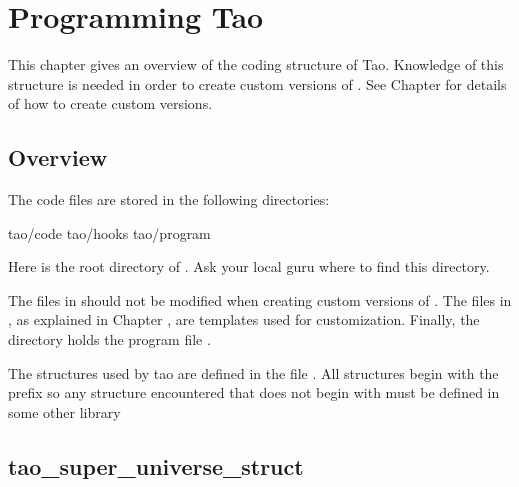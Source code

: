 \chapter{Programming Tao}
\label{c:programming}

This chapter gives an overview of the coding structure of Tao.
Knowledge of this structure is needed in order to create custom
versions of \tao. See Chapter  for details of
how to create custom versions.

\section{Overview}

The \tao code files are stored in the following directories:
\begin{example}
  tao/code
  tao/hooks
  tao/program
\end{example}
Here  is the root directory of \tao. Ask your local guru
where to find this directory.

The files in  should not be modified when creating
custom versions of \tao. The files in , as
explained in Chapter , are templates used
for customization. Finally, the directory  holds
the program file .

The structures used by tao are defined in the file .
All \tao structures begin with the prefix  so any structure
encountered that does not begin with  must be defined in some other library

\section{tao_super_universe_struct}
\label{s:super.uni.struct}

